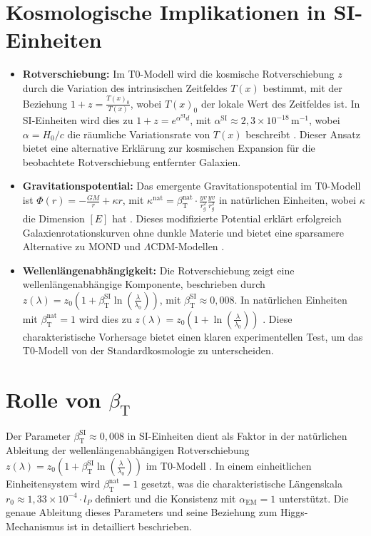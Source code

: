 \documentclass[12pt,a4paper]{article}
\newcommand{\Tfield}{T(x)}
\newcommand{\betaT}{\beta_{\text{T}}}
\newcommand{\alphaEM}{\alpha_{\text{EM}}}
\begin{document}
	\section{Kosmologische Implikationen in SI-Einheiten}
	\begin{itemize}
		\item \textbf{Rotverschiebung:} Im T0-Modell wird die kosmische Rotverschiebung \(z\) durch die Variation des intrinsischen Zeitfeldes \(\Tfield\) bestimmt, mit der Beziehung \(1 + z = \frac{\Tfield_0}{\Tfield}\), wobei \(\Tfield_0\) der lokale Wert des Zeitfeldes ist. In SI-Einheiten wird dies zu \(1 + z = e^{\alpha^{\text{SI}} d}\), mit \(\alpha^{\text{SI}} \approx 2,3 \times 10^{-18} \, \text{m}^{-1}\), wobei \(\alpha = H_0/c\) die räumliche Variationsrate von \(\Tfield\) beschreibt \cite{pascher_galaxies_2025, pascher_emergente_gravitation_2025}. Dieser Ansatz bietet eine alternative Erklärung zur kosmischen Expansion für die beobachtete Rotverschiebung entfernter Galaxien.
		
		\item \textbf{Gravitationspotential:} Das emergente Gravitationspotential im T0-Modell ist \(\Phi(r) = -\frac{GM}{r} + \kappa r\), mit \(\kappa^{\text{nat}} = \betaT^{\text{nat}} \cdot \frac{yv}{r_g^2}\frac{y v}{r_g^2}\) in natürlichen Einheiten, wobei \(\kappa\) die Dimension \([E]\) hat \cite{pascher_emergente_gravitation_2025}. Dieses modifizierte Potential erklärt erfolgreich Galaxienrotationskurven ohne dunkle Materie und bietet eine sparsamere Alternative zu MOND \cite{Milgrom1983} und \(\Lambda\)CDM-Modellen \cite{Planck2018}.
		
		\item \textbf{Wellenlängenabhängigkeit:} Die Rotverschiebung zeigt eine wellenlängenabhängige Komponente, beschrieben durch \(z(\lambda) = z_0 \left(1 + \betaT^{\text{SI}} \ln\left(\frac{\lambda}{\lambda_0}\right)\right)\), mit \(\betaT^{\text{SI}} \approx 0,008\). In natürlichen Einheiten mit \(\betaT^{\text{nat}} = 1\) wird dies zu \(z(\lambda) = z_0 \left(1 + \ln\left(\frac{\lambda}{\lambda_0}\right)\right)\) \cite{pascher_temp_2025, pascher_alphabeta_2025}. Diese charakteristische Vorhersage bietet einen klaren experimentellen Test, um das T0-Modell von der Standardkosmologie zu unterscheiden.
	\end{itemize}
	
	\section{Rolle von \(\betaT\)}
	Der Parameter \(\betaT^{\text{SI}} \approx 0,008\) in SI-Einheiten dient als Faktor in der natürlichen Ableitung der wellenlängenabhängigen Rotverschiebung \( z(\lambda) = z_0 \left(1 + \betaT^{\text{SI}} \ln\left(\frac{\lambda}{\lambda_0}\right)\right) \) im T0-Modell \cite{pascher_alphabeta_2025}. In einem einheitlichen Einheitensystem wird \(\betaT^{\text{nat}} = 1\) gesetzt, was die charakteristische Längenskala \( r_0 \approx 1,33 \times 10^{-4} \cdot l_P \) definiert und die Konsistenz mit \(\alphaEM = 1\) unterstützt. Die genaue Ableitung dieses Parameters und seine Beziehung zum Higgs-Mechanismus ist in \cite{pascher_params_2025, pascher_higgs_2025} detailliert beschrieben.
	
\end{document}
